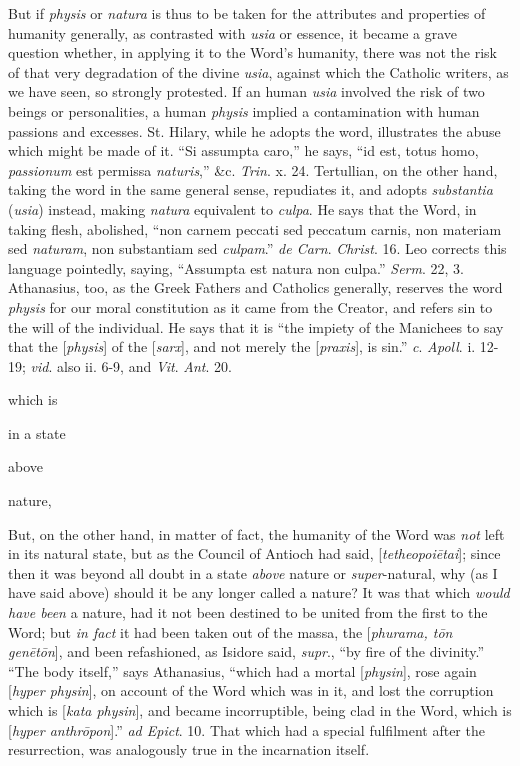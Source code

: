 But if \emph{physis} or \emph{natura}
is thus to be taken for the attributes and properties of
humanity generally, as contrasted with \emph{usia} or essence,
it became a grave question whether, in applying it to the Word's
humanity, there was not the risk of that very degradation of
the divine \emph{usia}, against which the Catholic writers, as
we have seen, so strongly protested. If an human \emph{usia}
involved the risk of two beings or personalities, a human \emph{physis}
implied a contamination with human passions and excesses. St.
Hilary, while he adopts the word, illustrates the abuse which
might be made of it. ``Si assumpta caro,'' he says, ``id est,
totus homo, \emph{passionum} est permissa \emph{naturis},''
\&c. \emph{Trin}. x. 24. Tertullian, on the other hand,
taking the word in the same general sense, repudiates it, and
adopts \emph{substantia} (\emph{usia}) instead, making \emph{natura}
equivalent to \emph{culpa}. He says that the Word, in taking
flesh, abolished, ``non carnem peccati sed peccatum carnis, non
materiam sed \emph{naturam}, non substantiam sed \emph{culpam}.''
\emph{de Carn}. \emph{Christ}. 16. Leo corrects this language
pointedly, saying, ``Assumpta est natura non culpa.'' \emph{Serm}.
22, 3. Athanasius, too, as the Greek Fathers and Catholics
generally, reserves the word \emph{physis} for our moral
constitution as it came from the Creator, and refers sin to
the will of the individual. He says that it is ``the impiety of
the Manichees to say that the [\emph{physis}] of the [\emph{sarx}],
and not merely the [\emph{praxis}], is sin.'' \emph{c}. \emph{Apoll}.
i. 12-19; \emph{vid}. also ii. 6-9, and \emph{Vit}. \emph{Ant}.
20. 

which is

in a state

above

nature,

But, on the other hand,
in matter of fact, the humanity of the Word was \emph{not}
left in its natural state, but as the Council of Antioch had
said, [\emph{tetheopoi\={e}tai}]; since then it was beyond
all doubt in a state \emph{above} nature or \emph{super}-natural,
why (as I have said above) should it be any longer called a
nature? It was that which \emph{would have been} a nature, had
it not been destined to be united from the first to the Word;
but \emph{in fact} it had been taken out of the massa, the [\emph{phurama,
t\={o}n gen\={e}t\={o}n}], and been refashioned,
as Isidore said, \emph{supr}., ``by fire of the divinity.'' ``The
body itself,'' says Athanasius, ``which had a mortal [\emph{physin}],
rose again [\emph{hyper physin}], on account of the Word which
was in it, and lost the corruption which is [\emph{kata physin}],
and became incorruptible, being clad in the Word, which is [\emph{hyper
anthr\={o}pon}].'' \emph{ad Epict}. 10. That which had a
special fulfilment after the resurrection, was analogously
true in the incarnation itself.

